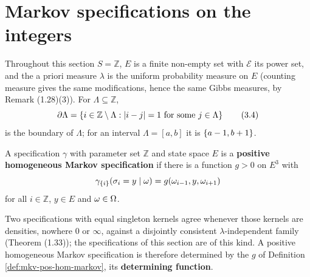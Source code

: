 \section{Markov specifications on the integers}

Throughout this section $S = \mathbb{Z}$, $E$ is a finite non-empty set with $\mathcal{E}$ its
power set, and the a priori measure $\lambda$ is the uniform probability measure on $E$
(counting measure gives the same modifications, hence the same Gibbs measures, by Remark
(1.28)(3)). For $\Lambda \subseteq \mathbb{Z}$,
\[
    \partial\Lambda = \left\{ i \in \mathbb{Z}\setminus\Lambda : |i - j| = 1 \text{ for some }
    j \in \Lambda \right\} \qquad (3.4)
\]
is the boundary of $\Lambda$; for an interval $\Lambda = [a,b]$ it is $\left\{ a-1, b+1 \right\}$.

\begin{definition}
    \label{def:mkv-pos-hom-markov}
    \leanok

    A specification $\gamma$ with parameter set $\mathbb{Z}$ and state space $E$ is a
    \textbf{positive homogeneous Markov specification} if there is a function $g > 0$ on $E^3$
    with
    \[
        \gamma_{\left\{ i \right\}}(\sigma_i = y \mid \omega) = g(\omega_{i-1}, y, \omega_{i+1})
    \]
    for all $i \in \mathbb{Z}$, $y \in E$ and $\omega \in \Omega$.
\end{definition}

\begin{remark}
    \label{rmk:mkv-comment-32}
    \leanok

    Two specifications with equal singleton kernels agree whenever those kernels are densities,
    nowhere $0$ or $\infty$, against a disjointly consistent $\lambda$-independent family
    (Theorem (1.33)); the specifications of this section are of this kind. A positive
    homogeneous Markov specification is therefore determined by the $g$ of Definition
    \ref{def:mkv-pos-hom-markov}, its \textbf{determining function}.
\end{remark}

